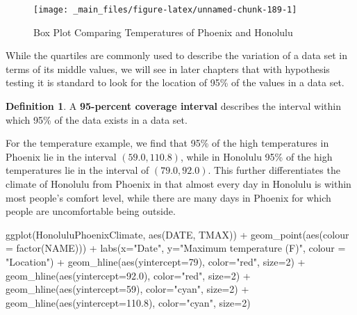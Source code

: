 \documentclass[
]{book}
\newenvironment{Shaded}{\begin{snugshade}}{\end{snugshade}}
\newcommand{\AttributeTok}[1]{\textcolor[rgb]{0.77,0.63,0.00}{#1}}
\newcommand{\DecValTok}[1]{\textcolor[rgb]{0.00,0.00,0.81}{#1}}
\newcommand{\FloatTok}[1]{\textcolor[rgb]{0.00,0.00,0.81}{#1}}
\newcommand{\FunctionTok}[1]{\textcolor[rgb]{0.00,0.00,0.00}{#1}}
\newcommand{\NormalTok}[1]{#1}
\newcommand{\SpecialCharTok}[1]{\textcolor[rgb]{0.00,0.00,0.00}{#1}}
\newcommand{\StringTok}[1]{\textcolor[rgb]{0.31,0.60,0.02}{#1}}
\theoremstyle{definition}
\newtheorem{definition}{Definition}[chapter]
\theoremstyle{definition}
\theoremstyle{definition}
\theoremstyle{definition}
\theoremstyle{remark}
\begin{document}
\begin{figure}

{\centering \texttt{[image: \_main\_files/figure-latex/unnamed-chunk-189-1]} 

}

\caption{Box Plot Comparing Temperatures of Phoenix and Honolulu}\label{fig:unnamed-chunk-189}
\end{figure}

While the quartiles are commonly used to describe the variation of a data set in terms of its middle values, we will see in later chapters that with hypothesis testing it is standard to look for the location of 95\% of the values in a data set.

\begin{definition}
A \textbf{95-percent coverage interval} describes the interval within which 95\% of the data exists in a data set.
\end{definition}

For the temperature example, we find that 95\% of the high temperatures in Phoenix lie in the interval \((59.0, 110.8)\), while in Honolulu 95\% of the high temperatures lie in the interval of \((79.0,92.0)\). This further differentiates the climate of Honolulu from Phoenix in that almost every day in Honolulu is within most people's comfort level, while there are many days in Phoenix for which people are uncomfortable being outside.

\begin{Shaded}
\begin{Highlighting}[]
\FunctionTok{ggplot}\NormalTok{(HonoluluPhoenixClimate, }\FunctionTok{aes}\NormalTok{(DATE, TMAX)) }\SpecialCharTok{+} \FunctionTok{geom\_point}\NormalTok{(}\FunctionTok{aes}\NormalTok{(}\AttributeTok{colour =} \FunctionTok{factor}\NormalTok{(NAME))) }\SpecialCharTok{+} \FunctionTok{labs}\NormalTok{(}\AttributeTok{x=}\StringTok{"Date"}\NormalTok{, }\AttributeTok{y=}\StringTok{"Maximum temperature (F)"}\NormalTok{, }\AttributeTok{colour =} \StringTok{"Location"}\NormalTok{) }\SpecialCharTok{+} \FunctionTok{geom\_hline}\NormalTok{(}\FunctionTok{aes}\NormalTok{(}\AttributeTok{yintercept=}\DecValTok{79}\NormalTok{), }\AttributeTok{color=}\StringTok{"red"}\NormalTok{, }\AttributeTok{size=}\DecValTok{2}\NormalTok{) }\SpecialCharTok{+} \FunctionTok{geom\_hline}\NormalTok{(}\FunctionTok{aes}\NormalTok{(}\AttributeTok{yintercept=}\FloatTok{92.0}\NormalTok{), }\AttributeTok{color=}\StringTok{"red"}\NormalTok{, }\AttributeTok{size=}\DecValTok{2}\NormalTok{) }\SpecialCharTok{+} \FunctionTok{geom\_hline}\NormalTok{(}\FunctionTok{aes}\NormalTok{(}\AttributeTok{yintercept=}\DecValTok{59}\NormalTok{), }\AttributeTok{color=}\StringTok{"cyan"}\NormalTok{, }\AttributeTok{size=}\DecValTok{2}\NormalTok{) }\SpecialCharTok{+} \FunctionTok{geom\_hline}\NormalTok{(}\FunctionTok{aes}\NormalTok{(}\AttributeTok{yintercept=}\FloatTok{110.8}\NormalTok{), }\AttributeTok{color=}\StringTok{"cyan"}\NormalTok{, }\AttributeTok{size=}\DecValTok{2}\NormalTok{)}
\end{Highlighting}
\end{Shaded}
\end{document}
